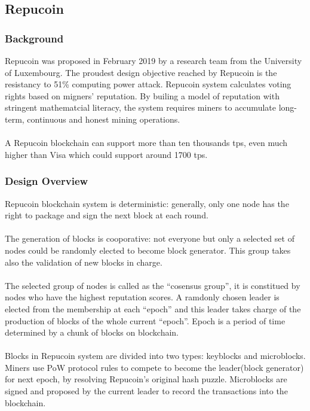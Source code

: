 \documentclass[doublespacing]{bmcart}
\begin{document}
\begin{CJK*}{UTF8}{gbsn}
	\subsection{Repucoin} 
	\subsubsection*{Background} 
	Repucoin was proposed in February 2019 by a research team from the University of Luxembourg. The proudest design objective reached by Repucoin is the resistancy to 51\% computing power attack. Repucoin system calculates voting rights based on migners' reputation. By builing a model of reputation with stringent mathematcial literacy, the system requires miners to accumulate long-term, continuous and honest mining operations.
	\paragraph{}
	A Repucoin blockchain can support more than ten thousands tps, even much higher than Visa which could support around 1700 tps.
	\subsubsection*{Design Overview}
	Repucoin blockchain system is deterministic: generally, only one node has the right to package and sign the next block at each round. 
	\paragraph{}
	The generation of blocks is cooporative: not everyone but only a selected set of nodes could be randomly elected to become block generator. This group takes also the validation of new blocks in charge.
	\paragraph{}
	The selected group of nodes is called as the ``cosensus group'', it is constitued by nodes who have the highest reputation scores. A ramdonly chosen leader is elected from the membership at each ``epoch'' and this leader takes charge of the production of blocks of the whole current ``epoch''. Epoch is a period of time determined by a chunk of blocks on blockchain.
	\paragraph{}
	Blocks in Repucoin system are divided into two types: keyblocks and microblocks. Miners use PoW protocol rules to compete to become the leader(block generator) for next epoch, by resolving Repucoin's original hash puzzle. Microblocks are signed and proposed by the current leader to record the transactions into the blockchain.

\end{CJK*}
\end{document}
